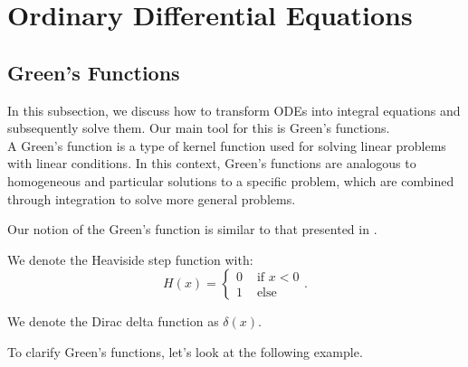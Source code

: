 \documentclass[a4paper,12pt]{article}
\begin{document}
\section{Ordinary Differential Equations}

\subsection{Green's Functions}
In this subsection, we discuss how to transform ODEs into integral equations and
subsequently solve them. Our main tool for this is Green's functions. \\

A Green's function is a type of kernel function used
for solving linear problems with linear conditions. In this context,
Green's functions are analogous to homogeneous and particular solutions
to a specific problem, which are combined through integration to solve
more general problems.

\begin{related}
    Our notion of the Green's function is similar to that presented
    in \cite{hwang_simulationtabulation_2001}.
\end{related}


\begin{notation}[$H$]
    We denote the Heaviside step function with:
    \begin{equation}
        H(x) = \begin{cases}
            0 & \text{ if } x<0 \\
            1 & \text{ else }
        \end{cases}.
    \end{equation}
\end{notation}

\begin{notation}[$\delta$]
    We denote the Dirac delta function as $\delta(x)$.
\end{notation}


To clarify Green's functions, let's look at the following example.
\end{document}
